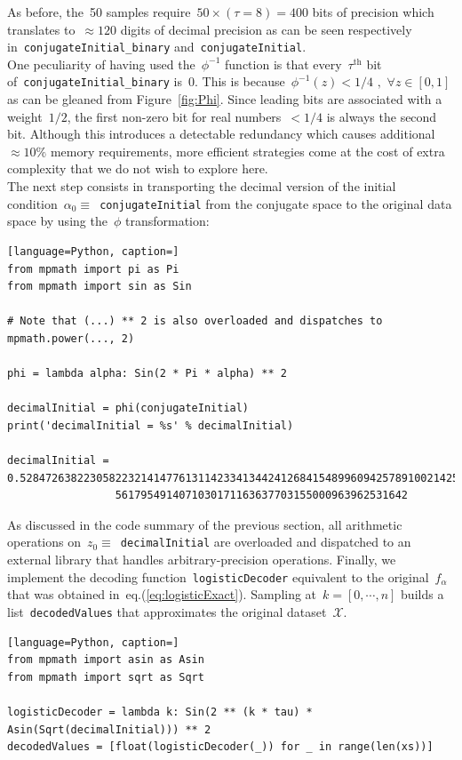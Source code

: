 \documentclass{article}
\begin{document}
\vspace{0.1cm}

\noindent As before, the~50 samples require~$50\times  (\tau=8)=400$ bits of precision which translates to~$\approx 120$ digits of decimal precision as can be seen respectively in~\texttt{conjugateInitial\_binary} and~\texttt{conjugateInitial}.   \\

\noindent One peculiarity of having used the~$\phi^{-1}$ function is that every~$\tau^\text{th}$ bit of~\texttt{conjugateInitial\_binary} is~0.  This is because~$\phi^{-1}(z) < 1/4 \,\, , \,\, \forall z \in [0,1]$ as can be gleaned from Figure~\ref{fig:Phi}.  Since leading bits are associated with a weight~$1/2$, the first non-zero bit for real numbers~$<1/4$ is always the second bit.  Although this introduces a detectable redundancy which causes additional~$\approx 10\%$ memory requirements, more efficient strategies come at the cost of extra complexity that we do not wish to explore here. \\

\noindent The next step consists in transporting the decimal version of the initial condition~$\alpha_0 \equiv$~\texttt{conjugateInitial} from the conjugate space to the original data space by using the~$\phi$ transformation: \\
\begin{lstlisting}[language=Python, caption=]
from mpmath import pi as Pi
from mpmath import sin as Sin

# Note that (...) ** 2 is also overloaded and dispatches to mpmath.power(..., 2)

phi = lambda alpha: Sin(2 * Pi * alpha) ** 2

decimalInitial = phi(conjugateInitial)
print('decimalInitial = %s' % decimalInitial)

decimalInitial = 0.5284726382230582232141477613114233413442412684154899609425789100214256216
                 5617954914071030171163637703155000963962531642

\end{lstlisting}

\vspace{0.3cm}

\noindent As discussed in the code summary of the previous section, all arithmetic operations on~$z_0 \equiv$~\texttt{decimalInitial} are overloaded and dispatched to an external library that handles arbitrary-precision operations.  Finally, we implement the decoding function~\texttt{logisticDecoder} equivalent to the original~$f_\alpha$ that was obtained in~eq.(\ref{eq:logisticExact}). Sampling at~$k=[0,\cdots,n]$ builds a list~\texttt{decodedValues} that approximates the original dataset~$\mathcal{X}$. \\
\begin{lstlisting}[language=Python, caption=]
from mpmath import asin as Asin
from mpmath import sqrt as Sqrt

logisticDecoder = lambda k: Sin(2 ** (k * tau) * Asin(Sqrt(decimalInitial))) ** 2
decodedValues = [float(logisticDecoder(_)) for _ in range(len(xs))]
\end{lstlisting}
\end{document}
